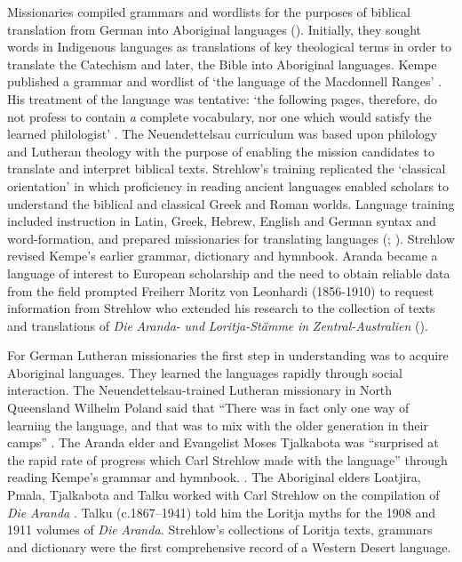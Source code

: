\documentclass[output=paper]{langsci/langscibook}
\begin{document}
Missionaries compiled grammars and wordlists for the purposes of biblical translation from German into Aboriginal languages (\citealt{harding_indigenous_2018}). Initially, they sought words in Indigenous languages as translations of key theological terms in order to translate the Catechism and later, the Bible into Aboriginal languages. Kempe published a grammar and wordlist of ‘the language of the Macdonnell Ranges’ \citep{kempe_grammar_1891}. His treatment of the language was tentative: ‘the following pages, therefore, do not profess to contain \textit{a} complete vocabulary, nor one which would satisfy the learned philologist’ \citep[1]{kempe_grammar_1891}. The Neuendettelsau curriculum was based upon philology and Lutheran theology with the purpose of enabling the mission candidates to translate and interpret biblical texts. Strehlow’s training replicated the ‘classical orientation’ \citep[83]{kenny_arandas_2013} in which proficiency in reading ancient languages enabled scholars to understand the biblical and classical Greek and Roman worlds. Language training included instruction in Latin, Greek, Hebrew, English and German syntax and word-formation, and prepared missionaries for translating languages (\citealt[8]{wendt_missionare_2001}; \citealt[26]{nobbs_bush_2005}). Strehlow revised Kempe’s earlier grammar, dictionary and hymnbook. Aranda became a language of interest to European scholarship and the need to obtain reliable data from the field prompted Freiherr Moritz von Leonhardi (1856-1910) to request information from Strehlow who extended his research to the collection of texts and translations of \textit{Die} \textit{Aranda-} \textit{und} \textit{Loritja-Stämme} \textit{in} \textit{Zentral-Australien} (\citealt{strehlow_aranda-und_1907}). 

For German Lutheran missionaries the first step in understanding was to acquire Aboriginal languages. They learned the languages rapidly through social interaction. The Neuendettelsau-trained Lutheran missionary in North Queensland Wilhelm Poland said that “There was in fact only one way of learning the language, and that was to mix with the older generation in their camps” \citep[103]{poland_loose_1988}. The Aranda elder and Evangelist Moses Tjalkabota was “surprised at the rapid rate of progress which Carl Strehlow made with the language” through reading Kempe’s grammar and hymnbook. \citep[65-66]{latz_blind_2014}. The Aboriginal elders Loatjira, Pmala, Tjalkabota and Talku worked with Carl Strehlow on the compilation of \textit{Die} \textit{Aranda} \citep[29]{kenny_arandas_2013}. Talku (c.1867–1941) told him the Loritja myths for the 1908 and 1911 volumes of \textit{Die} \textit{Aranda.} Strehlow’s collections of Loritja texts, grammars and dictionary were the first comprehensive record of a Western Desert language.
\end{document}
